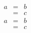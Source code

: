 \newcommand{\bea}{\begin{eqnarray}}
\newcommand{\eea}{\end{eqnarray}}
\bea
  a & = & b \\
    & = & c
\eea
\begin{eqnarray}
  a & = & b \\
    & = & c
\end{eqnarray}
